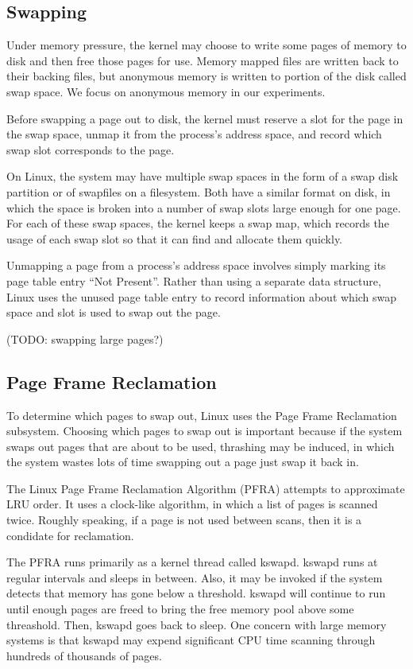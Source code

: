 \documentclass[twocolumn,11pt]{article}
\begin{document}
\subsection{Swapping}

Under memory pressure, the kernel may choose to write some pages of memory to
disk and then free those pages for use. Memory mapped files are written back to
their backing files, but anonymous memory is written to portion of the disk
called swap space. We focus on anonymous memory in our experiments.

Before swapping a page out to disk, the kernel must reserve a slot for the page
in the swap space, unmap it from the process's address space, and record which
swap slot corresponds to the page.

On Linux, the system may have multiple swap spaces in the form of a swap disk
partition or of swapfiles on a filesystem. Both have a similar format on disk,
in which the space is broken into a number of swap slots large enough for one
page. For each of these swap spaces, the kernel keeps a swap map, which records
the usage of each swap slot so that it can find and allocate them quickly.

Unmapping a page from a process's address space involves simply marking its page
table entry ``Not Present''. Rather than using a separate data structure, Linux
uses the unused page table entry to record information about which swap space
and slot is used to swap out the page.

(TODO: swapping large pages?)

\subsection{Page Frame Reclamation}

To determine which pages to swap out, Linux uses the Page Frame Reclamation
subsystem. Choosing which pages to swap out is important because if the system
swaps out pages that are about to be used, thrashing may be induced, in which
the system wastes lots of time swapping out a page just swap it back in.

The Linux Page Frame Reclamation Algorithm (PFRA) attempts to approximate LRU
order. It uses a clock-like algorithm, in which a list of pages is scanned
twice. Roughly speaking, if a page is not used between scans, then it is a
condidate for reclamation.

The PFRA runs primarily as a kernel thread called kswapd. kswapd runs at regular
intervals and sleeps in between. Also, it may be invoked if the system detects
that memory has gone below a threshold. kswapd will continue to run until enough
pages are freed to bring the free memory pool above some threashold. Then,
kswapd goes back to sleep.  One concern with large memory systems is that kswapd
may expend significant CPU time scanning through hundreds of thousands of pages.
\end{document}
